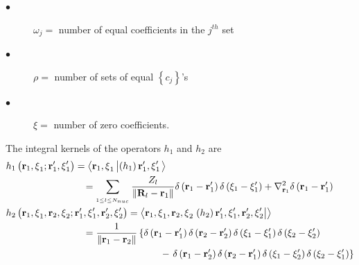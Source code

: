 \documentclass[aps,preprint]{revtex4}
\begin{document}
\begin{description}
\item[$\bullet $] $\omega _{j}=$ number of equal coefficients in the $j^{th}$
set

\item[$\bullet $] $\rho =$ number of sets of equal $\left\{ c_{j}\right\} $'s

\item[$\bullet $] $\xi =$ number of zero coefficients.
\end{description}

The integral kernels of the operators $h_{1}$ and $h_{2}$ are 
\begin{align}
& h_{1}\left( \mathbf{r}_{1}\mathbf{,\xi }_{1};\mathbf{r}_{1}^{\prime }%
\mathbf{,\xi }_{1}^{\prime }\right) =\left\langle \mathbf{r}_{1}\mathbf{,\xi 
}_{1}\left\vert \left( h_{1}\right) \mathbf{r}_{1}^{\prime }\mathbf{,\xi }%
_{1}^{\prime }\right. \right\rangle   \notag \\
& \qquad \qquad \qquad \qquad \left. =\right. \sum_{_{1\leq l\leq N_{nuc}}}%
\frac{Z_{l}}{\left\Vert \mathbf{R}_{l}-\mathbf{r}_{1}\right\Vert }\delta
\left( \mathbf{r}_{1}-\mathbf{r}_{1}^{\prime }\right) \delta \left( \mathbf{%
\xi }_{1}-\mathbf{\xi }_{1}^{\prime }\right) +\nabla _{\mathbf{r}%
_{1}}^{2}\delta \left( \mathbf{r}_{1}-\mathbf{r}_{1}^{\prime }\right)  
\notag \\
& h_{2}\left( \mathbf{r}_{1}\mathbf{,\xi }_{1},\mathbf{r}_{2}\mathbf{,\xi }%
_{2};\mathbf{r}_{1}^{\prime }\mathbf{,\xi }_{1}^{\prime },\mathbf{r}%
_{2}^{\prime }\mathbf{,\xi }_{2}^{\prime }\right) =\left\langle \mathbf{r}%
_{1}\mathbf{,\xi }_{1},\mathbf{r}_{2}\mathbf{,\xi }_{2}\left. \left(
h_{2}\right) \mathbf{r}_{1}^{\prime }\mathbf{,\xi }_{1}^{\prime },\mathbf{r}%
_{2}^{\prime }\mathbf{,\xi }_{2}^{\prime }\right\vert \right\rangle   \notag
\\
& \qquad \qquad \qquad \qquad \left. =\right. \frac{1}{\left\Vert \mathbf{r}%
_{1}-\mathbf{r}_{2}\right\Vert }\left\{ \delta \left( \mathbf{r}_{1}-\mathbf{%
r}_{1}^{\prime }\right) \delta \left( \mathbf{r}_{2}-\mathbf{r}_{2}^{\prime
}\right) \delta \left( \mathbf{\xi }_{1}-\mathbf{\xi }_{1}^{\prime }\right)
\delta \left( \mathbf{\xi }_{2}-\mathbf{\xi }_{2}^{\prime }\right) \right.  
\notag \\
& \qquad \qquad \qquad \qquad \qquad \qquad \qquad \qquad -\left. \delta
\left( \mathbf{r}_{1}-\mathbf{r}_{2}^{\prime }\right) \delta \left( \mathbf{r%
}_{2}-\mathbf{r}_{1}^{\prime }\right) \delta \left( \mathbf{\xi }_{1}-%
\mathbf{\xi }_{2}^{\prime }\right) \delta \left( \mathbf{\xi }_{2}-\mathbf{%
\xi }_{1}^{\prime }\right) \right\} 
\end{align}%
\end{document}
